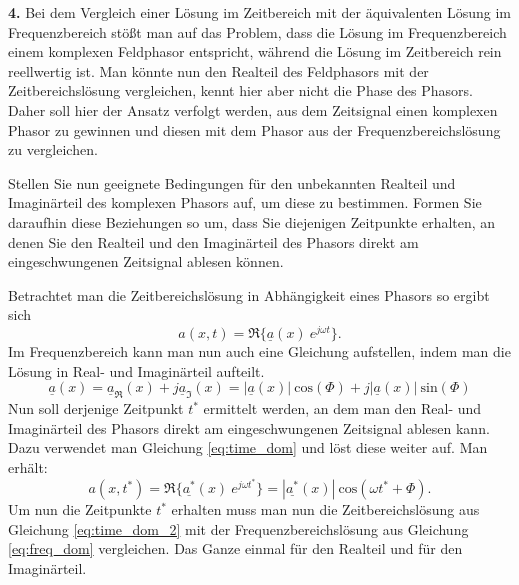 \documentclass[Protokollheft.tex]{subfiles}
\begin{document}
\begin{framed}
	\noindent \textbf{4.}\label{3}
      Bei dem Vergleich einer Lösung im Zeitbereich mit der äquivalenten Lösung im Frequenzbereich stößt man auf das Problem, dass die Lösung im 
      Frequenzbereich einem komplexen Feldphasor entspricht, während die Lösung im Zeitbereich rein reellwertig ist. Man könnte nun den Realteil 
      des Feldphasors mit der Zeitbereichslösung vergleichen, kennt hier aber nicht die Phase des Phasors. Daher soll hier der Ansatz verfolgt werden, 
      aus dem Zeitsignal einen komplexen Phasor zu gewinnen und diesen mit dem Phasor aus der Frequenzbereichslösung zu vergleichen.
      
Stellen Sie nun geeignete Bedingungen für den unbekannten Realteil und Imaginärteil des komplexen Phasors auf, um diese zu bestimmen. Formen Sie daraufhin diese Beziehungen so um, dass Sie diejenigen Zeitpunkte erhalten, an denen Sie den Realteil und den Imaginärteil des Phasors direkt am eingeschwungenen Zeitsignal ablesen können.\label{exer:calcTimes4RealImag}
\end{framed}
\noindent
Betrachtet man die Zeitbereichslösung in Abhängigkeit eines Phasors so ergibt sich 
\begin{equation}
a(x,t)=\Re\{\underline{a}(x)\ e^{j\omega t}\}.
\label{eq:time_dom}
\end{equation}
Im Frequenzbereich kann man nun auch eine Gleichung aufstellen, indem man die Lösung in Real- und Imaginärteil aufteilt.
\begin{equation}
\underline{a}(x)=\underline{a}_{\Re}(x) +j\underline{a}_{\Im}(x)=|\underline{a}(x)|\ \text{cos}(\Phi)+j|\underline{a}(x)|\ \text{sin}(\Phi)
\label{eq:freq_dom}
\end{equation}
Nun soll derjenige Zeitpunkt $t^*$ ermittelt werden, an dem man den Real- und Imaginärteil des Phasors direkt am eingeschwungenen Zeitsignal ablesen kann.
Dazu verwendet man Gleichung \ref{eq:time_dom} und löst diese weiter auf. Man erhält:
\begin{equation}
a(x,t^*)=\Re\{\underline{a^*}(x)\ e^{j\omega t^*}\}=|\underline{a^*}(x)|\ \text{cos}(\omega t^*+\Phi).
\label{eq:time_dom_2}
\end{equation}
Um nun die Zeitpunkte $t^*$ erhalten muss man nun die Zeitbereichslösung aus Gleichung \ref{eq:time_dom_2} mit der Frequenzbereichslösung aus Gleichung \ref{eq:freq_dom} vergleichen. Das Ganze einmal für den Realteil und für den Imaginärteil.\\
\\
\end{document}
